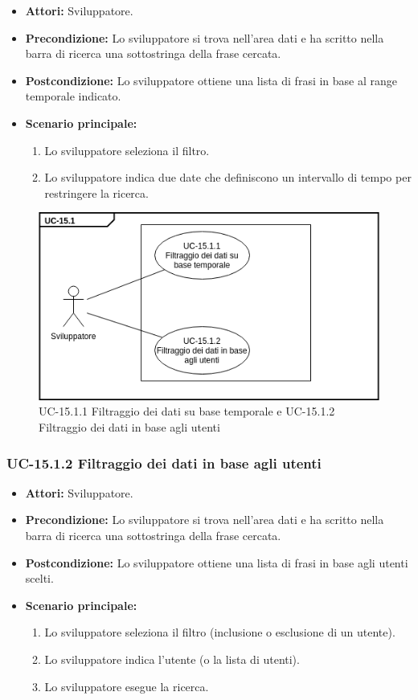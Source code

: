 		\begin{itemize}
			\item \textbf{Attori:} Sviluppatore.
			\item \textbf{Precondizione:} Lo sviluppatore si trova nell'area dati e ha scritto nella barra di ricerca una sottostringa della frase cercata.
			\item \textbf{Postcondizione:} Lo sviluppatore ottiene una lista di frasi in base al range temporale indicato.
			\item \textbf{Scenario principale:}
				\begin{enumerate}
					\item Lo sviluppatore seleziona il filtro.
					\item Lo sviluppatore indica due date che definiscono un intervallo di tempo per restringere la ricerca.
				\end{enumerate}
		\end{itemize}	
	\begin{figure}[h]
			\centering
			\includegraphics[scale=0.7]{images/UC-15_1_1.png}
			\caption{UC-15.1.1 Filtraggio dei dati su base temporale e UC-15.1.2 Filtraggio dei dati in base agli utenti}
		\end{figure}	
				
	\subsubsection{UC-15.1.2 Filtraggio dei dati in base agli utenti}	
		\begin{itemize}
			\item \textbf{Attori:} Sviluppatore.
			\item \textbf{Precondizione:} Lo sviluppatore si trova nell'area dati e ha scritto nella barra di ricerca una sottostringa della frase cercata.
			\item \textbf{Postcondizione:} Lo sviluppatore ottiene una lista di frasi in base agli utenti scelti.
			\item \textbf{Scenario principale:}
				\begin{enumerate}
					\item Lo sviluppatore seleziona il filtro (inclusione o esclusione di un utente).
					\item Lo sviluppatore indica l'utente (o la lista di utenti).
					\item Lo sviluppatore esegue la ricerca.
				\end{enumerate}
		\end{itemize}	
